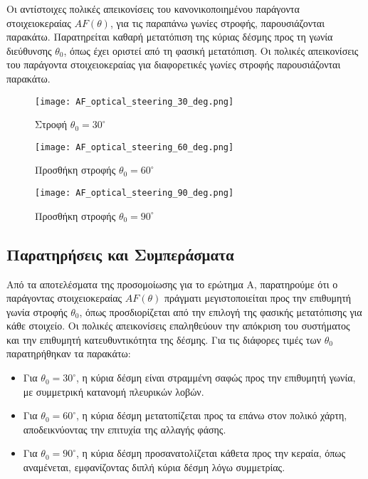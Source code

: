 \documentclass[a4paper,12pt]{report}
\begin{document}
\hspace{-0.6cm}Οι αντίστοιχες πολικές απεικονίσεις του κανονικοποιημένου παράγοντα στοιχειοκεραίας \(AF(\theta)\), για τις παραπάνω γωνίες στροφής, παρουσιάζονται παρακάτω. Παρατηρείται καθαρή μετατόπιση της κύριας δέσμης προς τη γωνία διεύθυνσης \(\theta_0\), όπως έχει οριστεί από τη φασική μετατόπιση. Οι πολικές απεικονίσεις του παράγοντα στοιχειοκεραίας για διαφορετικές γωνίες στροφής παρουσιάζονται παρακάτω.

\begin{figure}[H]
    \centering
    \texttt{[image: AF\_optical\_steering\_30\_deg.png]}
    \caption{Στροφή \( \theta_0 = 30^\circ \)}
\end{figure}

\begin{figure}[H]
    \centering
    \texttt{[image: AF\_optical\_steering\_60\_deg.png]}
    \caption{Προσθήκη στροφής \( \theta_0 = 60^\circ \)}
\end{figure}

\begin{figure}[H]
    \centering
    \texttt{[image: AF\_optical\_steering\_90\_deg.png]}
    \caption{Προσθήκη στροφής \( \theta_0 = 90^\circ \)}
\end{figure}

\subsection{Παρατηρήσεις και Συμπεράσματα}
Από τα αποτελέσματα της προσομοίωσης για το ερώτημα Α, παρατηρούμε ότι ο παράγοντας στοιχειοκεραίας \( AF(\theta) \) πράγματι μεγιστοποιείται προς την επιθυμητή γωνία στροφής \( \theta_0 \), όπως προσδιορίζεται από την επιλογή της φασικής μετατόπισης για κάθε στοιχείο. Οι πολικές απεικονίσεις επαληθεύουν την απόκριση του συστήματος και την επιθυμητή κατευθυντικότητα της δέσμης. Για τις διάφορες τιμές των \( \theta_0 \) παρατηρήθηκαν τα παρακάτω: 

\begin{itemize}
    \item Για \( \theta_0 = 30^\circ \), η κύρια δέσμη είναι στραμμένη σαφώς προς την επιθυμητή γωνία, με συμμετρική κατανομή πλευρικών λοβών.
    \item Για \( \theta_0 = 60^\circ \), η κύρια δέσμη μετατοπίζεται προς τα επάνω στον πολικό χάρτη, αποδεικνύοντας την επιτυχία της αλλαγής φάσης.
    \item Για \( \theta_0 = 90^\circ \), η κύρια δέσμη προσανατολίζεται κάθετα προς την κεραία, όπως αναμένεται, εμφανίζοντας διπλή κύρια δέσμη λόγω συμμετρίας.
\end{itemize}
\end{document}
